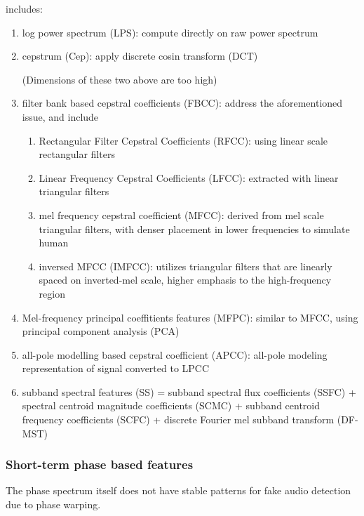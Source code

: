 \documentclass{article}
\begin{document}
includes: 
\begin{enumerate}
    \item log power spectrum (LPS): compute directly on raw power spectrum

    \item cepstrum (Cep): apply discrete cosin transform (DCT)

(Dimensions of these two above are too high)

    \item filter bank based cepstral coefficients (FBCC): address the aforementioned issue, 
and include 

    \begin{enumerate}
        \item Rectangular Filter Cepstral Coefficients (RFCC): using linear scale rectangular filters

        \item Linear Frequency Cepstral Coefficients (LFCC): extracted with linear triangular filters

        \item mel frequency cepstral coefficient (MFCC): derived from mel scale triangular filters, with denser placement in lower frequencies to simulate human

        \item inversed MFCC (IMFCC): utilizes triangular filters that are linearly spaced on inverted-mel scale, higher emphasis to the high-frequency region
    \end{enumerate}


    \item Mel-frequency principal coeffitients features (MFPC): similar to MFCC, using principal component analysis (PCA)

    \item all-pole modelling based cepstral coefficient (APCC): all-pole modeling representation of signal converted to LPCC

    \item subband spectral features (SS) = subband spectral flux coefficients (SSFC) + spectral centroid magnitude coefficients (SCMC) + subband centroid frequency coefficients (SCFC) + discrete Fourier mel subband transform (DF-MST)

\end{enumerate}

\subsubsection{Short-term phase based features}
The phase spectrum itself does not have stable patterns for fake audio detection due to phase warping. 
\end{document}
